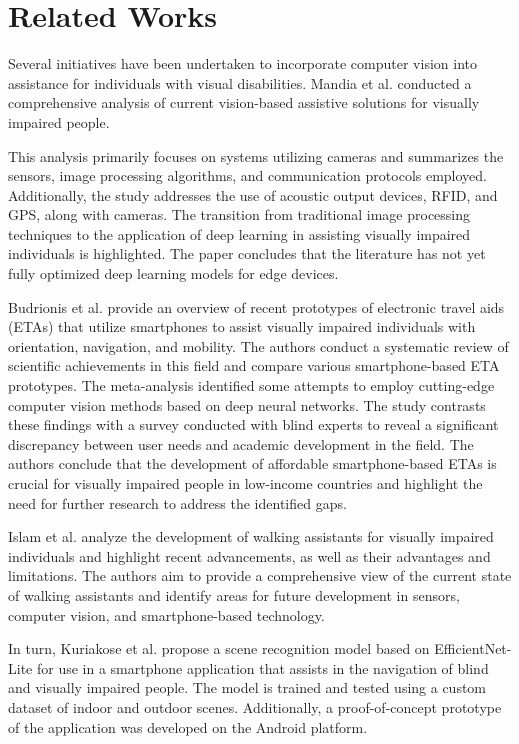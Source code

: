 \documentclass[preprint,12pt]{elsarticle}
\begin{document}
\section{Related Works}\label{sec:works}

Several initiatives have been undertaken to incorporate computer vision into assistance for individuals with visual disabilities. Mandia et al. \cite{mandia2023} conducted a comprehensive analysis of current vision-based assistive solutions for visually impaired people.

This analysis primarily focuses on systems utilizing cameras and summarizes the sensors, image processing algorithms, and communication protocols employed. Additionally, the study addresses the use of acoustic output devices, RFID, and GPS, along with cameras. The transition from traditional image processing techniques to the application of deep learning in assisting visually impaired individuals is highlighted. The paper concludes that the literature has not yet fully optimized deep learning models for edge devices.

Budrionis et al. \cite{budrionis2022} provide an overview of recent prototypes of electronic travel aids (ETAs) that utilize smartphones to assist visually impaired individuals with orientation, navigation, and mobility. The authors conduct a systematic review of scientific achievements in this field and compare various smartphone-based ETA prototypes. The meta-analysis identified some attempts to employ cutting-edge computer vision methods based on deep neural networks. The study contrasts these findings with a survey conducted with blind experts to reveal a significant discrepancy between user needs and academic development in the field. The authors conclude that the development of affordable smartphone-based ETAs is crucial for visually impaired people in low-income countries and highlight the need for further research to address the identified gaps.

Islam et al. \cite{islam2019} analyze the development of walking assistants for visually impaired individuals and highlight recent advancements, as well as their advantages and limitations. The authors aim to provide a comprehensive view of the current state of walking assistants and identify areas for future development in sensors, computer vision, and smartphone-based technology.

In turn, Kuriakose et al. \cite{kuriakose2021} propose a scene recognition model based on EfficientNet-Lite for use in a smartphone application that assists in the navigation of blind and visually impaired people. The model is trained and tested using a custom dataset of indoor and outdoor scenes. Additionally, a proof-of-concept prototype of the application was developed on the Android platform.
\end{document}
